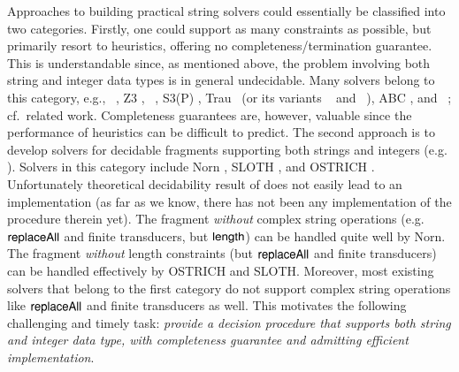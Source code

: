 Approaches to building practical string solvers could essentially be classified
into two categories. Firstly, one could support as many constraints as possible, but 
primarily resort to heuristics, 
offering no completeness/termination guarantee. This is understandable since, as
mentioned above, the problem involving both string and integer data types is in 
general undecidable. Many solvers
belong to this category, e.g., 
{\cvc}~\cite{cvc4}, Z3 \cite{BTV09,Z3}, {\zthree}~\cite{Z3-str3}, S3(P) \cite{S3,TCJ16},
Trau~\cite{Abdulla17} (or its variants {\trauplus}~\cite{AbdullaA+19} and {\zthreetrau}~\cite{Z3-trau}), ABC \cite{ABC}, and \slent~\cite{WC+18}; cf.\ related work.
%
%
Completeness guarantees are, however, valuable since %
the 
performance of heuristics can be difficult to predict.
The second approach is to develop solvers for decidable fragments
supporting both strings and integers (e.g. %
\cite{Vijay-length,BFL13,Abdulla14,AbdullaA+19,LB16,CCH+18,CHL+19,HJLRV18}). 
Solvers in this category include Norn \cite{Abdulla14}, SLOTH
\cite{HJLRV18}, and OSTRICH \cite{CHL+19}. Unfortunately
theoretical decidability result of \cite{LB16}  does not
easily lead to an implementation (as far as we know, there has not been any implementation of the procedure therein yet).
The fragment \emph{without} complex string operations (e.g. $\mathsf{replaceAll}$ and
finite transducers, but $\mathsf{length}$) can be handled quite well by Norn. The fragment \emph{without} length
constraints (but $\mathsf{replaceAll}$ and finite transducers)
can be handled effectively by OSTRICH and SLOTH. 
Moreover, most existing solvers that belong to the first category do not support
complex string operations like $\mathsf{replaceAll}$ and finite transducers as well.
This motivates the following challenging and timely task: 
\emph{provide a decision procedure that supports both string and integer data type, with completeness guarantee and admitting efficient implementation}.



